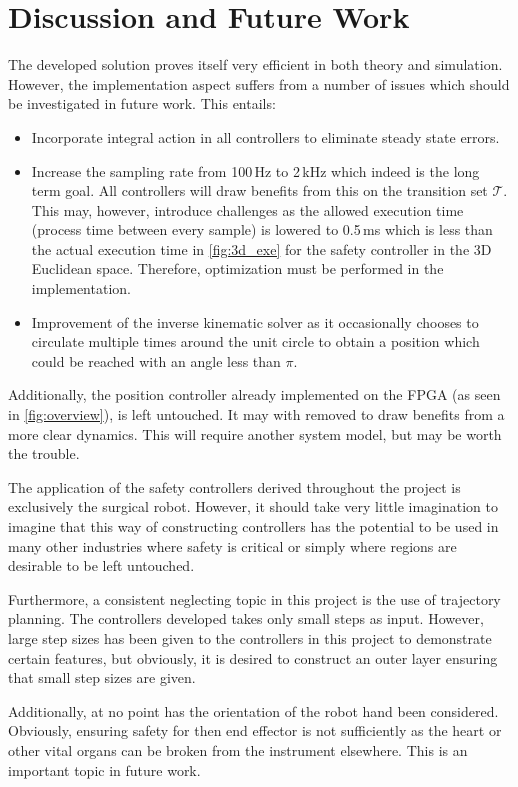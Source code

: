 \section*{Discussion and Future Work}
The developed solution proves itself very efficient in both theory and simulation. However, the implementation aspect suffers from a number of issues which should be investigated in future work. This entails:
\begin{itemize}
\item Incorporate integral action in all controllers to eliminate steady state errors.
\item Increase the sampling rate from 100\,Hz to 2\,kHz which indeed is the long term goal. All controllers will draw benefits from this on the transition set $\mathcal{T}$. This may, however, introduce challenges as the allowed execution time (process time between every sample) is lowered to 0.5\,ms which is less than the actual execution time in \autoref{fig:3d_exe} for the safety controller in the 3D Euclidean space. Therefore, optimization must be performed in the implementation.
\item Improvement of the inverse kinematic solver as it occasionally chooses to circulate multiple times around the unit circle to obtain a position which could be reached with an angle less than $\pi$.
\end{itemize}
Additionally, the position controller already implemented on the FPGA (as seen in \autoref{fig:overview}), is left untouched. It may with removed to draw benefits from a more clear dynamics. This will require another system model, but may be worth the trouble.

The application of the safety controllers derived throughout the project is exclusively the surgical robot. However, it should take very little imagination to imagine that this way of constructing controllers has the potential to be used in many other industries where safety is critical or simply where regions are desirable to be left untouched.

Furthermore, a consistent neglecting topic in this project is the use of trajectory planning. The controllers developed takes only small steps as input. However, large step sizes has been given to the controllers in this project to demonstrate certain features, but obviously, it is desired to construct an outer layer ensuring that small step sizes are given.

Additionally, at no point has the orientation of the robot hand been considered. Obviously, ensuring safety for then end effector is not sufficiently as the heart or other vital organs can be broken from the instrument elsewhere. This is an important topic in future work.

